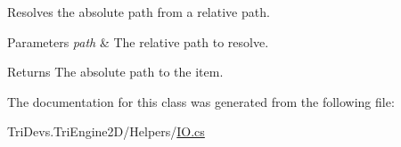 Resolves the absolute path from a relative path. 


\begin{DoxyParams}{Parameters}
{\em path} & The relative path to resolve.\\
\hline
\end{DoxyParams}
\begin{DoxyReturn}{Returns}
The absolute path to the item.
\end{DoxyReturn}


The documentation for this class was generated from the following file\-:\begin{DoxyCompactItemize}
\item 
Tri\-Devs.\-Tri\-Engine2\-D/\-Helpers/\hyperlink{_i_o_8cs}{I\-O.\-cs}\end{DoxyCompactItemize}
